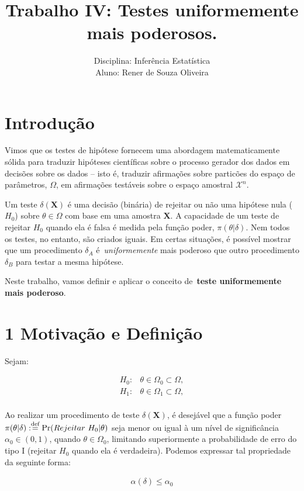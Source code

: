 \documentclass[a4paper,10pt, notitlepage]{report}
\title{Trabalho IV: Testes uniformemente mais poderosos.}
\author{Disciplina: Inferência Estatística \\ Aluno: Rener de Souza Oliveira}
\newcommand{\bX}{\boldsymbol{X}} %
\newcommand{\defn}{\stackrel{\textrm{\scriptsize def}}{=}}
\newcommand{\mysection}[2]{\setcounter{section}{#1}\addtocounter{section}{-1}\section*{#1 #2}}
\newcommand{\op}{\operatorname}
\begin{document}
	\maketitle

	
	\section{Introdução}
	
	Vimos que os testes de hipótese fornecem uma abordagem matematicamente sólida para traduzir hipóteses científicas sobre o processo gerador dos dados em decisões sobre os dados -- isto é, traduzir afirmações sobre particões do espaço de parâmetros, $\Omega$, em afirmações testáveis sobre o espaço amostral $\mathcal{X}^n$.
	
	Um teste $\delta(\bX)$ é uma decisão (binária) de rejeitar ou não uma hipótese nula ($H_0$) sobre $\theta \in \Omega$ com base em uma amostra $\bX$.
	A capacidade de um teste de rejeitar $H_0$ quando ela é falsa é medida pela função poder, $\pi(\theta |\delta)$.
	Nem todos os testes, no entanto, são criados iguais.
	Em certas situações, é possível mostrar que um procedimento $\delta_A$ é~\textit{uniformemente} mais poderoso que outro procedimento $\delta_B$ para testar a mesma hipótese.
	
	Neste trabalho, vamos definir e aplicar o conceito de~\textbf{teste uniformemente mais poderoso}.
	
	\mysection{1}{Motivação e Definição}
	
	Sejam:
	
	\begin{align}
	\label{h0h1}
	 H_0:& \theta \in \Omega_0\subset \Omega,\nonumber\\
	 H_1:& \theta \in \Omega_1\subset \Omega,\nonumber\\
	\end{align}
	
	
	Ao realizar um procedimento de teste $\delta(\bX)$, é desejável que a função poder $\pi(\theta|\delta):\defn \op{Pr}(Rejeitar ~H_0|\theta)$ seja menor ou igual à um nível de significância $\alpha_0\in (0,1)$, quando $\theta\in\Omega_0$, limitando superiormente a probabilidade de erro do tipo I (rejeitar $H_0$ quando ela é verdadeira). Podemos expressar tal propriedade da seguinte forma:
	
	\begin{align*}
		\alpha(\delta)\leq \alpha_0
	\end{align*}
	
\end{document}
